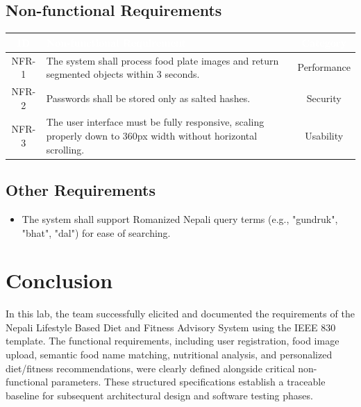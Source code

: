 \documentclass[11pt,a4paper]{article}
\newcommand{\reqheader}[3]{%
  \rowcolor{srsnavy}
  \textcolor{white}{\textbf{#1}} &
  \textcolor{white}{\textbf{#2}} &
  \textcolor{white}{\textbf{#3}} \\ \hline}
\begin{document}
\subsection{Non-functional Requirements}
\renewcommand{\arraystretch}{1.35}
\begin{tabularx}{\textwidth}{|c|X|c|}
\hline
\reqheader{ID}{Non-functional Requirement}{Category}
NFR-1 & The system shall process food plate images and return segmented objects within 3 seconds. & Performance \\ \hline
NFR-2 & Passwords shall be stored only as salted hashes. & Security \\ \hline
NFR-3 & The user interface must be fully responsive, scaling properly down to 360px width without horizontal scrolling. & Usability \\ \hline
\end{tabularx}

\subsection{Other Requirements}
\begin{itemize}[leftmargin=*]
  \item The system shall support Romanized Nepali query terms (e.g., "gundruk", "bhat", "dal") for ease of searching.
\end{itemize}

\section{Conclusion}
In this lab, the team successfully elicited and documented the requirements of the Nepali Lifestyle Based Diet and Fitness Advisory System using the IEEE 830 template. The functional requirements, including user registration, food image upload, semantic food name matching, nutritional analysis, and personalized diet/fitness recommendations, were clearly defined alongside critical non-functional parameters. These structured specifications establish a traceable baseline for subsequent architectural design and software testing phases.
\end{document}
